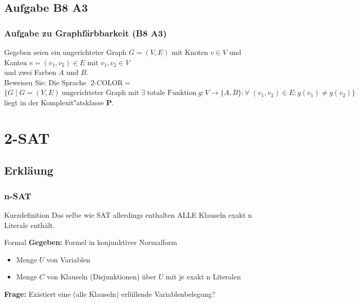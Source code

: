 \subsection{Aufgabe B8 A3}
\begin{frame}
	\frametitle{Aufgabe zu Graphfärbbarkeit (B8 A3)}
	Gegeben seien ein ungerichteter Graph $G = (V,E)$ mit Knoten $v \in V$ und
	Kanten $e = (v_1,v_2) \in E$ mit $v_1, v_2 \in V$\\ und zwei Farben $A$ und $B$.\\
	Beweisen Sie: Die Sprache $\mbox{2-COLOR} \; =$\\
	$\{G \; | \; G = (V,E) \; \mbox{ungerichteter Graph mit} \; \exists \; \mbox{totale
	Funktion} \; g: V \to \{A,B\}: \forall \; (v_1, v_2) \in E: g(v_1) \neq g(v_2)\}$\\
	liegt in der Komplexit"atsklasse \textbf{P}.
\end{frame}

\section{2-SAT}
\subsection{Erkläung}
\begin{frame}
	\frametitle{n-SAT}
	\begin{block}{Kurzdefinition}
	Das selbe wie SAT allerdings enthalten ALLE Klauseln exakt n Literale enthält.\\
	\end{block}
	\begin{block}{Formal}
\textbf{Gegeben:} Formel in konjunktiver Normalform
\begin{itemize}
 \item Menge $U$ von Variablen
 \item Menge $C$ von Klauseln (Disjunktionen) über $U$ mit je exakt n Literalen
\end{itemize} %

\textbf{Frage:} Existiert eine (alle Klauseln) erfüllende Variablenbelegung?
\end{block}

\end{frame}
